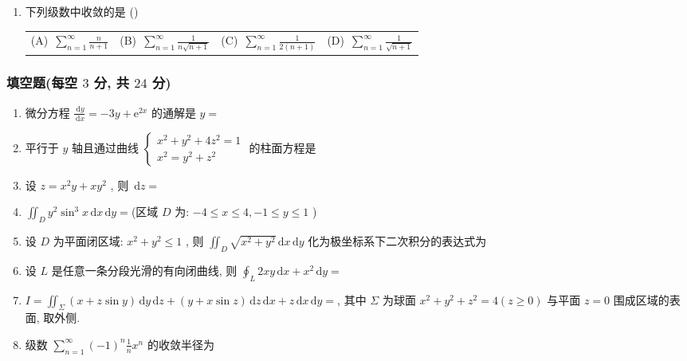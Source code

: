 \documentclass[cn,11pt,fancy,hide]{elegantbook}
\makeatletter
\newcommand{\ee}{\mathrm{e}}
\newcommand{\dd}{\,\mathrm{d}}
\renewcommand{\leq}{\leqslant}
\renewcommand{\geq}{\geqslant}
\newcommand{\fourch}[4]{\\\begin{tabular}{*{4}{@{}p{4cm}}}(A)~#1 & (B)~#2 & (C)~#3 & (D)~#4\end{tabular}} %
\makeatother
\begin{document}
\begin{enumerate}
	\item 下列级数中收敛的是 (\hspace{1pc})
	\fourch{$\sum_{n=1}^{\infty} \frac{n}{n+1}$}{$\sum_{n=1}^{\infty} \frac{1}{n \sqrt{n+1}}$}{$\sum_{n=1}^{\infty} \frac{1}{2(n+1)}$}{$\sum_{n=1}^{\infty} \frac{1}{\sqrt{n+1}}$}
\end{enumerate}

\subsubsection{填空题(每空 $3$ 分, 共 $24$ 分)}
\begin{enumerate}
	\item 微分方程 $\frac{\dd y}{\dd x}=-3 y+\ee^{2 x}$ 的通解是 $y=$\underline{\hspace{8pc}}
	
	\item 平行于 $y$ 轴且通过曲线 $\begin{cases}
	x^{2}+y^{2}+4 z^{2}=1\\
	x^{2}=y^{2}+z^{2}
	\end{cases}$ 的柱面方程是\underline{\hspace{8pc}}
	
	\item 设 $z=x^{2} y+x y^{2}$ , 则 $\dd z=$\underline{\hspace{8pc}}
	
	\item $\iint_{D} y^{2} \sin ^{3} x \dd x \dd y=$\underline{\hspace{8pc}}(区域 $D$ 为: $-4 \leq x \leq 4,-1 \leq y \leq 1$ )
	
	\item 设 $D$ 为平面闭区域: $x^{2}+y^{2} \leq 1$ , 则 $\iint_{D} \sqrt{x^{2}+y^{2}} \dd x \dd y$ 化为极坐标系下二次积分的表达式为\underline{\hspace{8pc}}
	
	\item 设 $L$ 是任意一条分段光滑的有向闭曲线, 则 $\oint_{L} 2 x y \dd x+x^{2} \dd y=$\underline{\hspace{8pc}}
	
	\item $I=\iint_{\Sigma}(x+z \sin y) \dd y \dd z+(y+x \sin z) \dd z \dd x+z \dd x \dd y=$\underline{\hspace{8pc}}, 其中 $\Sigma$ 为球面 $x^{2}+y^{2}+z^{2}=4(z \geq 0)$ 与平面 $z=0$ 围成区域的表面, 取外侧.
	
	\item 级数 $\sum_{n=1}^{\infty}(-1)^{n} \frac{1}{n} x^{n}$ 的收敛半径为\underline{\hspace{8pc}}
\end{enumerate}
\end{document}
